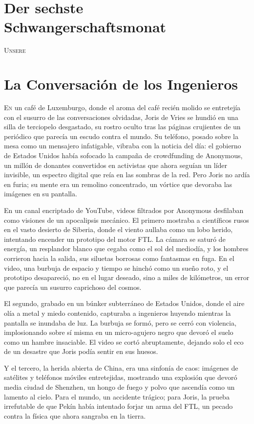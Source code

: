 
\chapter*{Der sechste Schwangerschaftsmonat}
\lettrine[lines=2, loversize=0.3, lraise=0]{\initfamily U}{nsere}

\chapter{La Conversación de los Ingenieros}

\lettrine[lines=2, loversize=0.3, lraise=0]{E}{n} un café de Luxemburgo, donde el aroma del café recién molido se entretejía con el susurro de las conversaciones olvidadas, Joris de Vries se hundió en una silla de terciopelo desgastado, su rostro oculto tras las páginas crujientes de un periódico que parecía un escudo contra el mundo. Su teléfono, posado sobre la mesa como un mensajero infatigable, vibraba con la noticia del día: el gobierno de Estados Unidos había sofocado la campaña de crowdfunding de Anonymous, un millón de donantes convertidos en activistas que ahora seguían un líder invisible, un espectro digital que reía en las sombras de la red. Pero Joris no ardía en furia; su mente era un remolino concentrado, un vórtice que devoraba las imágenes en su pantalla.

En un canal encriptado de YouTube, videos filtrados por Anonymous desfilaban como visiones de un apocalipsis mecánico. El primero mostraba a científicos rusos en el vasto desierto de Siberia, donde el viento aullaba como un lobo herido, intentando encender un prototipo del motor FTL. La cámara se saturó de energía, un resplandor blanco que cegaba como el sol del mediodía, y los hombres corrieron hacia la salida, sus siluetas borrosas como fantasmas en fuga. En el video, una burbuja de espacio y tiempo se hinchó como un sueño roto, y el prototipo desapareció, no en el lugar deseado, sino a miles de kilómetros, un error que parecía un susurro caprichoso del cosmos.

El segundo, grabado en un búnker subterráneo de Estados Unidos, donde el aire olía a metal y miedo contenido, capturaba a ingenieros huyendo mientras la pantalla se inundaba de luz. La burbuja se formó, pero se cerró con violencia, implosionando sobre sí misma en un micro-agujero negro que devoró el suelo como un hambre insaciable. El video se cortó abruptamente, dejando solo el eco de un desastre que Joris podía sentir en sus huesos.

Y el tercero, la herida abierta de China, era una sinfonía de caos: imágenes de satélites y teléfonos móviles entretejidas, mostrando una explosión que devoró media ciudad de Shenzhen, un hongo de fuego y polvo que ascendía como un lamento al cielo. Para el mundo, un accidente trágico; para Joris, la prueba irrefutable de que Pekín había intentado forjar un arma del FTL, un pecado contra la física que ahora sangraba en la tierra.

